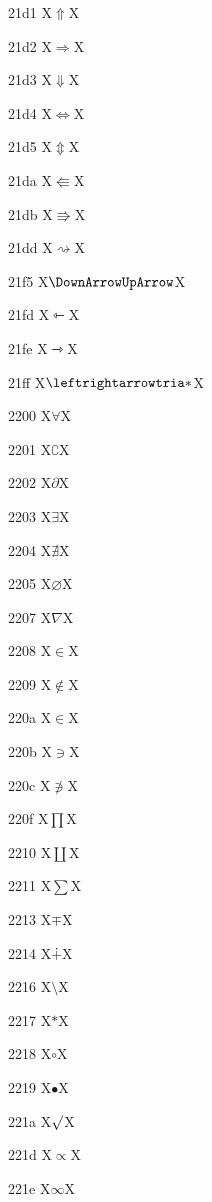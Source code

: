 \documentclass[11pt]{article}
\begin{document}
21d1 X{\ensuremath{\Uparrow}}X

21d2 X{\ensuremath{\Rightarrow}}X

21d3 X{\ensuremath{\Downarrow}}X

21d4 X{\ensuremath{\Leftrightarrow}}X

21d5 X{\ensuremath{\Updownarrow}}X

21da X{\ensuremath{\Lleftarrow}}X

21db X{\ensuremath{\Rrightarrow}}X

21dd X{\ensuremath{\rightsquigarrow}}X

21f5 X{\ensuremath{\DownArrowUpArrow}}X

21fd X{\ensuremath{\leftarrowtriangle}}X

21fe X{\ensuremath{\rightarrowtriangle}}X

21ff X{\ensuremath{\leftrightarrowtria*}}X

2200 X{\ensuremath{\forall}}X

2201 X{\ensuremath{\complement}}X

2202 X{\ensuremath{\partial}}X

2203 X{\ensuremath{\exists}}X

2204 X{\ensuremath{\nexists}}X

2205 X{\ensuremath{\varnothing}}X

2207 X{\ensuremath{\nabla}}X

2208 X{\ensuremath{\in}}X

2209 X{\ensuremath{\notin}}X

220a X{\ensuremath{\in}}X

220b X{\ensuremath{\ni}}X

220c X{\ensuremath{\not\ni}}X

220f X{\ensuremath{\prod}}X

2210 X{\ensuremath{\coprod}}X

2211 X{\ensuremath{\sum}}X

2213 X{\ensuremath{\mp}}X

2214 X{\ensuremath{\dotplus}}X

2216 X{\ensuremath{\setminus}}X

2217 X{\ensuremath{\ast}}X

2218 X{\ensuremath{\circ}}X

2219 X{\ensuremath{\bullet}}X

221a X{\ensuremath{\surd}}X

221d X{\ensuremath{\propto}}X

221e X{\ensuremath{\infty}}X
\end{document}
